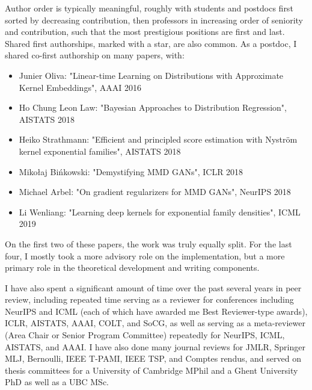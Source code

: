 \documentclass[12pt]{article}
\begin{document}
Author order is typically meaningful,
roughly with students and postdocs first sorted by decreasing contribution,
then professors in increasing order of seniority and contribution,
such that the most prestigious positions are first and last.
Shared first authorships, marked with a star, are also common.
As a postdoc, I shared co-first authorship on many papers, with:
\begin{itemize}[nosep]
\item Junier Oliva: "Linear-time Learning on Distributions with Approximate Kernel Embeddings", AAAI 2016
\item Ho Chung Leon Law: "Bayesian Approaches to Distribution Regression", AISTATS 2018
\item Heiko Strathmann: "Efficient and principled score estimation with Nyström kernel exponential families", AISTATS 2018
\item Mikołaj Bińkowski: "Demystifying MMD GANs", ICLR 2018
\item Michael Arbel: "On gradient regularizers for MMD GANs", NeurIPS 2018
\item Li Wenliang: "Learning deep kernels for exponential family densities", ICML 2019
\end{itemize}
On the first two of these papers, the work was truly equally split. For the last four, I mostly took a more advisory role on the implementation, but a more primary role in the theoretical development and writing components.

I have also spent a significant amount of time over the past several years in peer review, including repeated time serving as a reviewer for conferences including NeurIPS and ICML (each of which have awarded me Best Reviewer-type awards), ICLR, AISTATS, AAAI, COLT, and SoCG, as well as serving as a meta-reviewer (Area Chair or Senior Program Committee) repeatedly for NeurIPS, ICML, AISTATS, and AAAI. I have also done many journal reviews for JMLR, Springer MLJ, Bernoulli, IEEE T-PAMI, IEEE TSP, and Comptes rendus, and served on thesis committees for a University of Cambridge MPhil and a Ghent University PhD as well as a UBC MSc.

\clearpage
\end{document}
